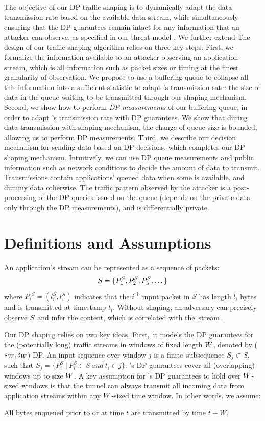 The objective of our DP traffic shaping is to dynamically adapt the data transmission rate based on the available data stream, while simultaneously ensuring that the DP guarantees remain intact for any information that an attacker can observe, as specified in our threat model {\addref}.
We further extend 
The design of our traffic shaping algorithm relies on three key steps.
%
First, we formalize the information available to an attacker observing an application stream, which is all information such as packet sizes or timing at the finest granularity of observation.
We propose to use a buffering queue to collapse all this information into a sufficient statistic to adapt {\sys}'s transmission rate: the size of data in the queue waiting to be transmitted through our shaping mechanism.
%
Second, we show how to perform {\em DP measurements} of our buffering queue, in order to adapt \sys's transmission rate with DP guarantees.
We show that during data transmission with {\sys} shaping mechanism, the change of queue size is bounded, allowing us to perform DP measurements.
%
Third, we describe our decision mechanism for sending data based on DP decisions, which completes our DP shaping mechanism.
Intuitively, we can use DP queue measurements and public information such as network conditions to decide the amount of data to transmit.
Transmissions contain applications' queued data when some is available, and dummy data otherwise.
The traffic pattern observed by the attacker is a post-processing of the DP queries issued on the queue (depends on the private data only through the DP measurements), and is differentially private.


\section{Definitions and Assumptions}
\label{sec:defs}
An application's stream can be represented as a sequence of packets:
\begin{equation}
    S = \{{P^S_1}, {P^S_2}, {P^S_3}, \dots \}
\end{equation}
where ${P_i}^S = (l^S_i, t^S_i)$ indicates that the $i$\textsuperscript{th} input packet in $S$ has length $l_i$ bytes and is transmitted at timestamp $t_i$.
Without shaping, an adversary can precisely observe $S$ and infer
the content, which is correlated with the~stream~\cite{schuster2017beautyburst}.

Our DP shaping relies on two key ideas.
First,~it models the DP guarantees for the (potentially long) traffic streams in
windows of fixed length $W$, denoted by \mbox{($\varepsilon_{W},
\delta_{W}$)-DP}.
An input sequence over window $j$ is a finite~sub\-sequence $S_{j} \subset S$,
such that
$S_{j} = \{ P^S_i~|~P^S_i \in S~and~t_i \in j \}$.
{\sys}'s DP guarantees cover all (overlapping) windows up to size
$W$.
A key assumption for {\sys}'s DP guarantees to hold over $W$-sized windows
is that the tunnel can always transmit all incoming data from
application streams within any $W$-sized time window.
In other words, we assume:
\begin{assumption}\label{assumption:window}
  All bytes enqueued prior to or at time $t$ are transmitted by time
  $t+W$.
\end{assumption}